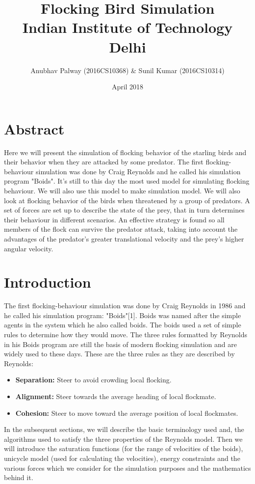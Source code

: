 \documentclass{article}
\title{Flocking Bird Simulation\\
\large Indian Institute of Technology Delhi}
\author{Anubhav Palway (2016CS10368) \& Sunil Kumar (2016CS10314) }
\date{April 2018}
\begin{document}
\tableofcontents

\maketitle

\section{Abstract}
Here we will present the simulation of flocking behavior of the starling birds and their behavior when they are attacked by some predator. The first flocking-behaviour simulation was done by Craig Reynolds and he called his simulation program "Boids". It's still to this day the most used model for simulating flocking behaviour. We will also use this model to make simulation model. We will also look at flocking behavior of the birds when threatened by a group of predators. A set of forces are set up to describe the state of the prey, that in turn determines their behaviour in different scenarios. An effective strategy is found so all members of the flock can survive the predator attack, taking into account the advantages of the predator’s greater translational velocity and the prey’s higher angular velocity.

\section{Introduction}
The first flocking-behaviour simulation was done by Craig Reynolds in 1986 and he called his simulation program: "Boids"[1]. Boids was named after the simple agents in the system which he also called boids. The boids used a set of simple rules to determine how they would move. The three rules formatted by Reynolds in his Boids program are still the basis of modern flocking simulation and are widely used to these days. These are the three rules as they are described by Reynolds:\\
\begin{itemize}
    \item \textbf{Separation: } Steer to avoid crowding local flocking.
    \item \textbf{Alignment: } Steer towards the average heading of local flockmate.
    \item \textbf{Cohesion: } Steer to move toward the average position of local flockmates.
    
\end{itemize}

\bigbreak
In the subsequent sections, we will describe the basic terminology used and, the algorithms used to satisfy the three properties of the Reynolds model. Then we will introduce the saturation functions (for the range of velocities of the boids), unicycle model (used for calculating the velocities), energy constraints and the various forces which we consider for the simulation purposes and the mathematics behind it.
\end{document}

